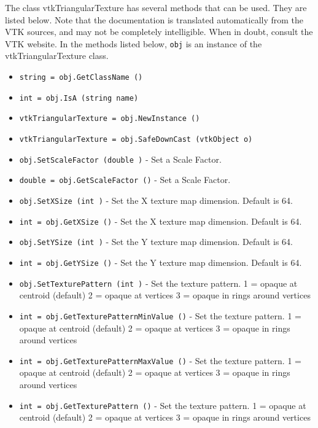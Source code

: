 The class vtkTriangularTexture has several methods that can be used.
  They are listed below.
Note that the documentation is translated automatically from the VTK sources,
and may not be completely intelligible.  When in doubt, consult the VTK website.
In the methods listed below, \verb|obj| is an instance of the vtkTriangularTexture class.
\begin{itemize}
\item  \verb|string = obj.GetClassName ()|

\item  \verb|int = obj.IsA (string name)|

\item  \verb|vtkTriangularTexture = obj.NewInstance ()|

\item  \verb|vtkTriangularTexture = obj.SafeDownCast (vtkObject o)|

\item  \verb|obj.SetScaleFactor (double )| -  Set a Scale Factor.

\item  \verb|double = obj.GetScaleFactor ()| -  Set a Scale Factor.

\item  \verb|obj.SetXSize (int )| -  Set the X texture map dimension. Default is 64.

\item  \verb|int = obj.GetXSize ()| -  Set the X texture map dimension. Default is 64.

\item  \verb|obj.SetYSize (int )| -  Set the Y texture map dimension. Default is 64.

\item  \verb|int = obj.GetYSize ()| -  Set the Y texture map dimension. Default is 64.

\item  \verb|obj.SetTexturePattern (int )| -  Set the texture pattern.
    1 = opaque at centroid (default)
    2 = opaque at vertices
    3 = opaque in rings around vertices

\item  \verb|int = obj.GetTexturePatternMinValue ()| -  Set the texture pattern.
    1 = opaque at centroid (default)
    2 = opaque at vertices
    3 = opaque in rings around vertices

\item  \verb|int = obj.GetTexturePatternMaxValue ()| -  Set the texture pattern.
    1 = opaque at centroid (default)
    2 = opaque at vertices
    3 = opaque in rings around vertices

\item  \verb|int = obj.GetTexturePattern ()| -  Set the texture pattern.
    1 = opaque at centroid (default)
    2 = opaque at vertices
    3 = opaque in rings around vertices

\end{itemize}
